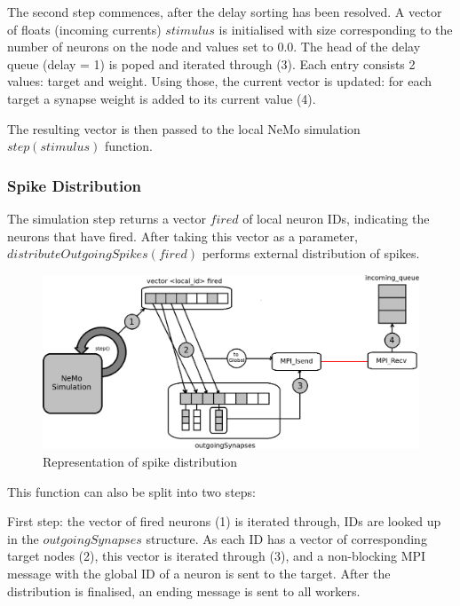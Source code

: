 The second step commences, after the delay sorting has been resolved. A vector of floats (incoming currents) $stimulus$ is initialised with size corresponding to the number of neurons on the node and values set to 0.0. The head of the delay queue (delay = 1) is poped and iterated through (3). Each entry consists 2 values: target and weight. Using those, the current vector is updated: for each target a synapse weight is added to its current value (4).

The resulting vector is then passed to the local NeMo simulation $step(stimulus)$ function.

\subsubsection{Spike Distribution}

The simulation step returns a vector $fired$ of local neuron IDs, indicating the neurons that have fired. After taking this vector as a parameter, $distributeOutgoingSpikes(fired)$ performs external distribution of spikes.

\begin{figure}[h]
\begin{center}
\includegraphics[scale = 0.5]{images/spike_distribution_scheme.png}
\end{center}
\caption{Representation of spike distribution}
\end{figure}

This function can also be split into two steps:

First step: the vector of fired neurons (1) is iterated through, IDs are looked up in the $outgoingSynapses$ structure. As each ID has a vector of corresponding target nodes (2), this vector is iterated through (3), and a non-blocking MPI message with the global ID of a neuron is sent to the target. After the distribution is finalised, an ending message is sent to all workers.

